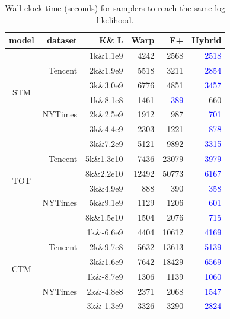 \documentclass[10pt,journal,cspaper,compsoc]{IEEEtran}
\begin{document}
\begin{table}[t]
	\caption{Wall-clock time (seconds) for samplers to reach the same log likelihood.}
	\begin{tabular}{|c|r|r|r|r|r|}
		\hline
		\textbf{model} & 
		\textbf{dataset} & 
		\textbf{K\& L} & 
		\textbf{Warp} &
		\textbf{F+} &
		\textbf{Hybrid}\\
		\hline
		\hline
		\multirow{6}{*}{STM} &
		\multirow{3}{*}{Tencent} & 1k\&1.1e9 & 4242  & 2568 & \textcolor{blue}{2518}\\
		\cline{3-6} & & 2k\&1.9e9 & 5518  & 3211 & \textcolor{blue}{2854}\\
		\cline{3-6} & & 3k\&3.0e9 & 6776  & 4851 & \textcolor{blue}{3457}\\
		\cline{2-6} & \multirow{3}{*}{NYTimes} & 1k\&8.1e8 & 1461  & \textcolor{blue}{389} & 660\\
		\cline{3-6}& & 2k\&2.5e9 & 1912  & 987 & \textcolor{blue}{701}\\
		\cline{3-6}& & 3k\&4.4e9 & 2303  & 1221 & \textcolor{blue}{878}\\
		\hline
		\hline
		\multirow{6}{*}{TOT} &
		\multirow{3}{*}{Tencent} & 3k\&7.2e9 & 5121  & 9892 & \textcolor{blue}{3315}\\
		\cline{3-6} & & 5k\&1.3e10 & 7436  & 23079 & \textcolor{blue}{3979}\\
		\cline{3-6} & & 8k\&2.2e10 & 12492  & 50773 & \textcolor{blue}{6167}\\
		\cline{2-6} & \multirow{3}{*}{NYTimes} & 3k\&4.9e9 & 888  & 390 & \textcolor{blue}{358}\\
		\cline{3-6}& & 5k\&9.1e9 & 1129  & 1206 & \textcolor{blue}{601}\\
		\cline{3-6}& & 8k\&1.5e10 & 1504  & 2076 & \textcolor{blue}{715}\\
		\hline
		\hline
		\multirow{6}{*}{CTM} &
		\multirow{3}{*}{Tencent} &
		1k\&-6.6e9 & 4404  & 10612 & \textcolor{blue}{4169}\\
		\cline{3-6}& & 2k\&9.7e8 & 5632  & 13613 & \textcolor{blue}{5139}\\
		\cline{3-6}& & 3k\&1.6e9 & 7642 & 18429 & \textcolor{blue}{6569}\\
		\cline{2-6} & \multirow{3}{*}{NYTimes} &
		1k\&-8.7e9 & 1306  & 1139 & \textcolor{blue}{1060}\\
		\cline{3-6} & & 2k\&-4.8e8 & 2371  & 2068 & \textcolor{blue}{1547}\\
		\cline{3-6} & & 3k\&-1.3e9 & 3326  & 3290 & \textcolor{blue}{2824}\\
		\hline
	\end{tabular}
	\label{tb:wall_time}
\end{table}
\end{document}
